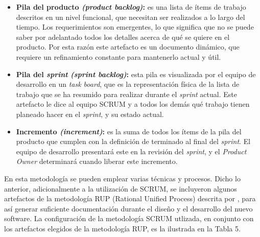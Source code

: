 			\begin{itemize}
				\item \textbf{Pila del producto \textit{(product backlog)}: }
					es una lista de \'{i}tems de trabajo descritos en un nivel funcional, que necesitan ser realizados a lo largo del tiempo. Los requerimientos son emergentes, lo que significa que no se puede saber por adelantado todos los detalles acerca de qu\'{e} se quiere en el producto. Por esta raz\'{o}n este artefacto es un documento din\'{a}mico, que requiere un refinamiento constante para mantenerlo actual y \'{u}til.
				
				\item \textbf{Pila del \textit{sprint} \textit{(sprint backlog)}: }
				esta pila es visualizada por el equipo de desarrollo en un \textit{task board}, que es la representaci\'{o}n f\'{i}sica de la lista de trabajo que se ha resumido para realizar durante el \textit{sprint} actual. Este artefacto le dice al equipo SCRUM y a todos los dem\'{a}s qu\'{e} trabajo tienen planeado hacer en el \textit{sprint}, y su estado actual.
				
				\item \textbf{Incremento \textit{(increment)}: }
				es la suma de todos los \'{i}tems de la pila del producto que cumplen con la definici\'{o}n de terminado al final del \textit{sprint}. El equipo de desarrollo presentar\'{a} este en la revisi\'{o}n del \textit{sprint}, y el \textit{Product Owner} determinar\'{a} cuando liberar este incremento.
				
			\end{itemize}
			
En esta metodolog\'{i}a se pueden emplear varias t\'{e}cnicas y procesos. Dicho lo anterior, adicionalmente a la utilizaci\'{o}n de SCRUM, se incluyeron algunos artefactos de la metodolog\'{i}a RUP (Rational Unified Process) descrita por \cite{Kroll&Kruchten}, para as\'{i} generar suficiente documentaci\'{o}n durante el dise\~{n}o y el desarrollo del nuevo software. La configuraci\'{o}n de la metodolog\'{i}a SCRUM utlizada, en conjunto con los artefactos elegidos de la metodolog\'{i}a RUP, es la ilustrada en la Tabla 5.

